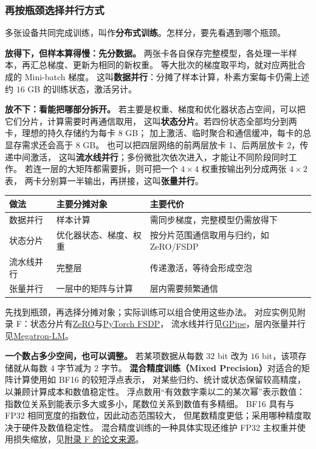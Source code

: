 \subsubsection*{再按瓶颈选择并行方式}
多张设备共同完成训练，叫作\textbf{分布式训练}。怎样分，要先看遇到哪个瓶颈。

\textbf{放得下，但样本算得慢：先分数据。}
两张卡各自保存完整模型，各处理一半样本，再汇总梯度、更新为相同的新权重。
等大批次的梯度取平均，就对应两批合成的 Mini-batch 梯度。
这叫\textbf{数据并行}：分摊了样本计算，朴素方案每卡仍需上述约 $16$ GB 的训练状态，激活另计。

\textbf{放不下：看能把哪部分拆开。}
若主要是权重、梯度和优化器状态占空间，可以把它们分片，计算需要时再通信取用，
这叫\textbf{状态分片}。若四份状态全部均分到两卡，理想的持久存储约为每卡 $8$ GB；
加上激活、临时聚合和通信缓冲，每卡的总显存需求还会高于 $8$ GB。
也可以把四层网络的前两层放卡 1、后两层放卡 2，传递中间激活，
这叫\textbf{流水线并行}；多份微批次依次进入，才能让不同阶段同时工作。
若连一层的大矩阵都需要拆，则可把一个 $4\times4$ 权重按输出列分成两张 $4\times2$ 表，
两卡分别算一半输出，再拼接，这叫\textbf{张量并行}。



\begin{center}\small
{}
\begin{tabularx}{\linewidth}{@{}p{31mm}p{35mm}>{\raggedright\arraybackslash}X@{}}
\toprule
做法 & 主要分摊对象 & 主要代价\\\midrule
数据并行 & 样本计算 & 需同步梯度，完整模型仍需放得下\\
状态分片 & 优化器状态、梯度、权重 & 按分片范围通信取用与归约，如 ZeRO/FSDP\\
流水线并行 & 完整层 & 传递激活，等待会形成空泡\\
张量并行 & 一层中的矩阵与计算 & 层内需要频繁通信\\
\bottomrule
\end{tabularx}
\end{center}
先找到瓶颈，再选择分摊对象；实际训练可以组合使用这些办法。
对应实例见附录 F：状态分片有\hyperref[source:zero]{ZeRO}与\hyperref[source:pytorch-fsdp]{PyTorch FSDP}，
流水线并行见\hyperref[source:gpipe]{GPipe}，层内张量并行见\hyperref[source:megatron-lm]{Megatron-LM}。

\label{concept:mixed-precision}
\textbf{一个数占多少空间，也可以调整。}
若某项数据从每数 $32$ bit 改为 $16$ bit，该项存储就从每数 $4$ 字节减为 $2$ 字节。
\textbf{混合精度训练（Mixed Precision）}对适合的矩阵计算使用如 BF16 的较短浮点表示，
对某些归约、统计或状态保留较高精度，以兼顾计算成本和数值稳定性。
浮点数用“有效数字乘以二的某次幂”表示数值：指数位关系到能表示多大或多小，尾数位关系到数值有多精细。
BF16 具有与 FP32 相同宽度的指数位，因此动态范围较大，
但尾数精度更低；采用哪种精度取决于硬件及数值稳定性。
混合精度训练的一种具体实现还维护 FP32 主权重并使用损失缩放，见\hyperref[source:mixed-precision]{附录 F 的论文来源}。

